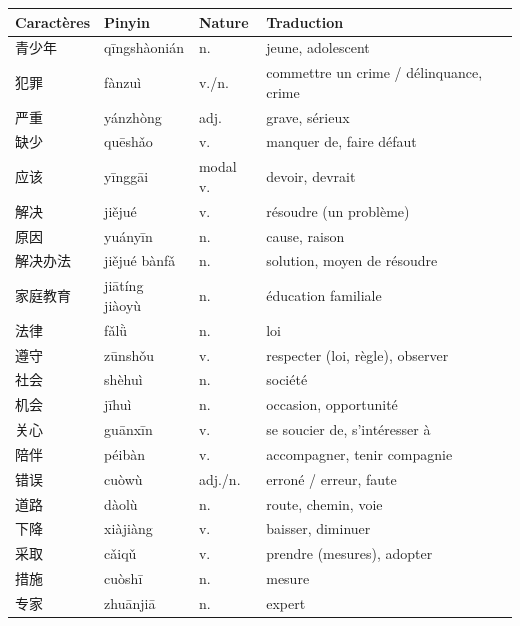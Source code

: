 \documentclass[11pt]{article}
\begin{document}
\begin{definition}
\begin{center}
\begin{tabularx}{\linewidth}{|X|X|X|X|}\hline
\rowcolor{popblueL} \textbf{Caractères} & \textbf{Pinyin} & \textbf{Nature} & \textbf{Traduction} \\ \hline
青少年 & qīngshàonián & n. & jeune, adolescent \\ \hline
犯罪 & fànzuì & v./n. & commettre un crime / délinquance, crime \\ \hline
严重 & yánzhòng & adj. & grave, sérieux \\ \hline
缺少 & quēshǎo & v. & manquer de, faire défaut \\ \hline
应该 & yīnggāi & modal v. & devoir, devrait \\ \hline
解决 & jiějué & v. & résoudre (un problème) \\ \hline
原因 & yuányīn & n. & cause, raison \\ \hline
解决办法 & jiějué bànfǎ & n. & solution, moyen de résoudre \\ \hline
家庭教育 & jiātíng jiàoyù & n. & éducation familiale \\ \hline
法律 & fǎlǜ & n. & loi \\ \hline
遵守 & zūnshǒu & v. & respecter (loi, règle), observer \\ \hline
社会 & shèhuì & n. & société \\ \hline
机会 & jīhuì & n. & occasion, opportunité \\ \hline
关心 & guānxīn & v. & se soucier de, s'intéresser à \\ \hline
陪伴 & péibàn & v. & accompagner, tenir compagnie \\ \hline
错误 & cuòwù & adj./n. & erroné / erreur, faute \\ \hline
道路 & dàolù & n. & route, chemin, voie \\ \hline
下降 & xiàjiàng & v. & baisser, diminuer \\ \hline
采取 & cǎiqǔ & v. & prendre (mesures), adopter \\ \hline
措施 & cuòshī & n. & mesure \\ \hline
专家 & zhuānjiā & n. & expert \\ \hline
\end{tabularx}
\end{center}
\end{definition}
\end{document}
